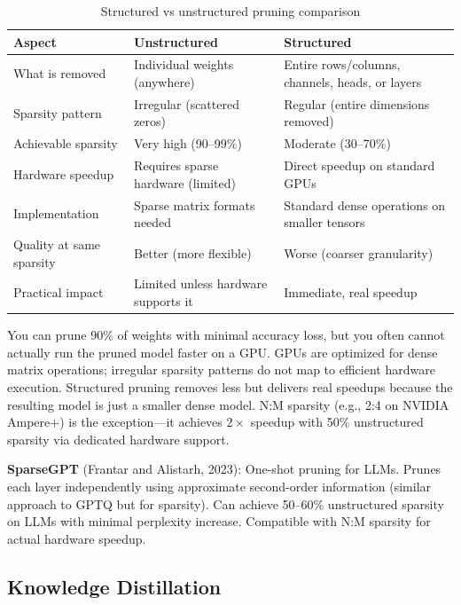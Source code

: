 \begin{table}[H]
\centering
\caption{Structured vs unstructured pruning comparison}
\begin{tabularx}{\textwidth}{lXX}
\toprule
\textbf{Aspect} & \textbf{Unstructured} & \textbf{Structured} \\
\midrule
What is removed & Individual weights (anywhere) & Entire rows/columns, channels, heads, or layers \\
Sparsity pattern & Irregular (scattered zeros) & Regular (entire dimensions removed) \\
Achievable sparsity & Very high (90--99\%) & Moderate (30--70\%) \\
Hardware speedup & Requires sparse hardware (limited) & Direct speedup on standard GPUs \\
Implementation & Sparse matrix formats needed & Standard dense operations on smaller tensors \\
Quality at same sparsity & Better (more flexible) & Worse (coarser granularity) \\
Practical impact & Limited unless hardware supports it & Immediate, real speedup \\
\bottomrule
\end{tabularx}
\end{table}

\begin{keyinsight}
You can prune 90\% of weights with minimal accuracy loss, but you often cannot actually run the pruned model faster on a GPU. GPUs are optimized for dense matrix operations; irregular sparsity patterns do not map to efficient hardware execution. Structured pruning removes less but delivers real speedups because the resulting model is just a smaller dense model. N:M sparsity (e.g., 2:4 on NVIDIA Ampere+) is the exception---it achieves $2\times$ speedup with 50\% unstructured sparsity via dedicated hardware support.
\end{keyinsight}

\textbf{SparseGPT} (Frantar and Alistarh, 2023): One-shot pruning for LLMs. Prunes each layer independently using approximate second-order information (similar approach to GPTQ but for sparsity). Can achieve 50--60\% unstructured sparsity on LLMs with minimal perplexity increase. Compatible with N:M sparsity for actual hardware speedup.

\subsection{Knowledge Distillation}

